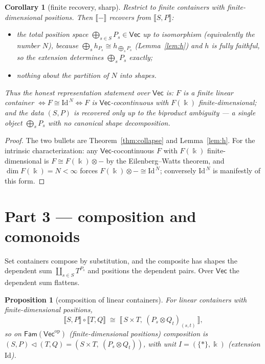 \documentclass[11pt]{amsart}
\theoremstyle{plain}
\newtheorem{proposition}[theorem]{Proposition}
\newtheorem{corollary}[theorem]{Corollary}
\theoremstyle{definition}
\renewcommand{\Vec}{\mathsf{Vec}}
\newcommand{\Fam}{\mathsf{Fam}}
\newcommand{\op}{\mathrm{op}}
\newcommand{\Id}{\mathrm{Id}}
\newcommand{\ext}[1]{\llbracket #1 \rrbracket}
\newcommand{\fld}{\Bbbk}
\newcommand{\bul}{{-}}
\newcommand{\iso}{\cong}
\DeclareMathOperator{\dcoprod}{\textstyle\coprod}
\begin{document}
\begin{corollary}[finite recovery, sharp]\label{cor:recovery}
Restrict to finite containers with finite-dimensional positions. Then
$\ext{\bul}$ recovers from $\ext{S,P}$:
\begin{itemize}
\item the total position space $\bigoplus_{s\in S}P_s\in\Vec$ up to isomorphism
  (equivalently the number $N$), because $\bigoplus_s h_{P_s}\iso
  h_{\bigoplus_s P_s}$ (Lemma~\ref{lem:h}) and $h$ is fully faithful, so the
  extension determines $\bigoplus_s P_s$ exactly;
\item \emph{nothing} about the partition of $N$ into shapes.
\end{itemize}
Thus the honest representation statement over $\Vec$ is: $F$ is a finite linear
container $\iff F\iso\Id^{\,N}\iff F$ is $\Vec$-cocontinuous with $F(\fld)$
finite-dimensional; and the data $(S,P)$ is recovered only up to the biproduct
ambiguity --- a single object $\bigoplus_s P_s$ with no canonical shape
decomposition.
\end{corollary}

\begin{proof}
The two bullets are Theorem~\ref{thm:collapse} and Lemma~\ref{lem:h}. For the
intrinsic characterization: any $\Vec$-cocontinuous $F$ with $F(\fld)$
finite-dimensional is $F\iso F(\fld)\otimes\bul$ by the Eilenberg--Watts theorem,
and $\dim F(\fld)=N<\infty$ forces $F(\fld)\otimes\bul\iso\Id^{\,N}$; conversely
$\Id^{\,N}$ is manifestly of this form.
\end{proof}

\section{Part 3 --- composition and comonoids}\label{sec:comp}

Set containers compose by substitution, and the composite has shapes the
dependent sum $\dcoprod_{s\in S}T^{P_s}$ and positions the dependent pairs. Over
$\Vec$ the dependent sum flattens.

\begin{proposition}[composition of linear containers]\label{prop:comp}
For linear containers with finite-dimensional positions,
\[
  \ext{S,P}\circ\ext{T,Q}\;\iso\;\ext{\,S\times T,\ (P_s\otimes Q_t)_{(s,t)}\,},
\]
so on $\Fam(\Vec^\op)$ (finite-dimensional positions) composition is
$(S,P)\lhd(T,Q)=(S\times T,\ (P_s\otimes Q_t))$, with unit $I=(\{*\},\fld)$
(extension $\Id$).
\end{proposition}
\end{document}
